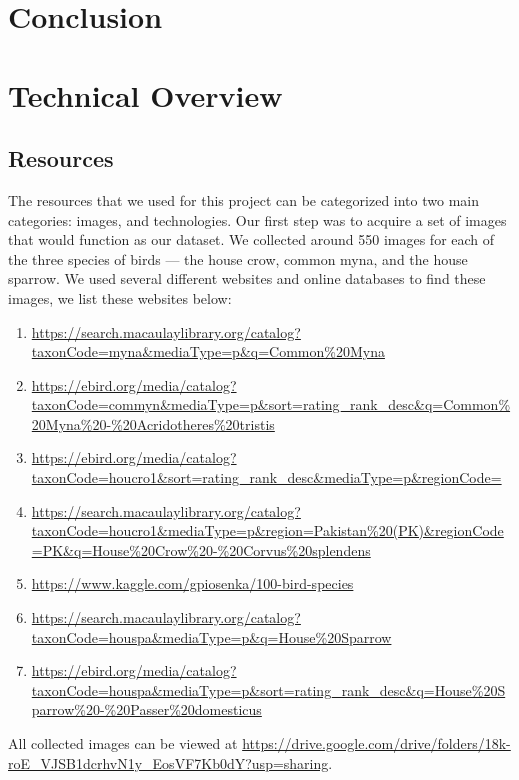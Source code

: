 \documentclass[11pt]{article}
\begin{document}
\section{Conclusion}
\newpage

\section{Technical Overview}
\subsection{Resources}
  The resources that we used for this project can be categorized into two main 
  categories: images, and technologies. Our first step was to acquire a set of images that would 
  function as our dataset. We collected around 550 images for each of the three 
  species of birds --- the house crow, common myna, and the house sparrow. We used 
  several different websites and online databases to find these images, we list 
  these websites below: 
  \begin{enumerate}
    \item \url{https://search.macaulaylibrary.org/catalog?taxonCode=myna&mediaType=p&q=Common\%20Myna}
    \item \url{https://ebird.org/media/catalog?taxonCode=commyn&mediaType=p&sort=rating_rank_desc&q=Common\%20Myna\%20-\%20Acridotheres\%20tristis}
    \item \url{https://ebird.org/media/catalog?taxonCode=houcro1&sort=rating_rank_desc&mediaType=p&regionCode=}
    \item \url{https://search.macaulaylibrary.org/catalog?taxonCode=houcro1&mediaType=p&region=Pakistan\%20(PK)&regionCode=PK&q=House\%20Crow\%20-\%20Corvus\%20splendens}
    \item \url{https://www.kaggle.com/gpiosenka/100-bird-species}
    \item \url{https://search.macaulaylibrary.org/catalog?taxonCode=houspa&mediaType=p&q=House\%20Sparrow}
    \item \url{https://ebird.org/media/catalog?taxonCode=houspa&mediaType=p&sort=rating_rank_desc&q=House\%20Sparrow\%20-\%20Passer\%20domesticus}
    \label{imagelinks}
  \end{enumerate}
  \setlength{\parskip}{1em}
  All collected images can be viewed at \url{https://drive.google.com/drive/folders/18k-roE_VJSB1dcrhvN1y_EosVF7Kb0dY?usp=sharing}.
\end{document}
